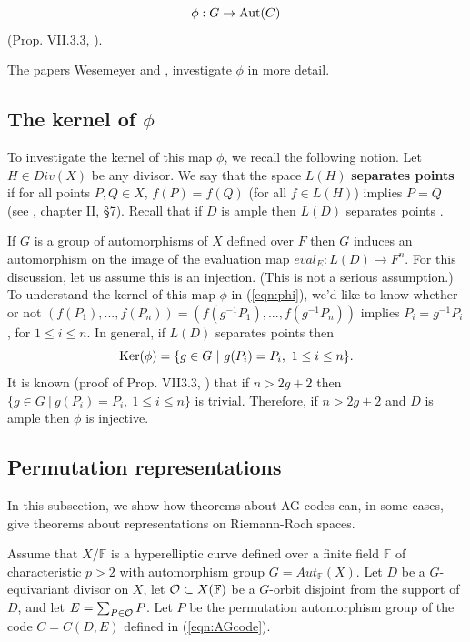 \documentclass[12pt]{article}
\numberwithin{equation}{section}
\def\fff{{\mathbb{F}}}
\begin{document}
\begin{equation}
\label{eqn:phi}
\phi:G\rightarrow {\rm Aut}(C) 
\end{equation}
(Prop. VII.3.3, \cite{Sti}).

The papers Wesemeyer \cite{W} and \cite{JT}, \cite{JK1} investigate 
$\phi$ in more detail.

\subsection{The kernel of $\phi$}

To investigate the kernel of this map $\phi$, we recall the following 
notion. Let $H\in Div(X)$ be any divisor.
We say that the space $L(H)$ {\bf separates points} if for
all points $P,Q\in X$,
$f(P)=f(Q)$ (for all $f\in L(H)$) 
implies $P=Q$ (see \cite{H}, chapter II, \S 7). 
Recall that if $D$ is ample then $L(D)$ separates points \cite{H}.

If $G$ is a group of automorphisms of $X$ defined over $F$
then $G$ induces an automorphism on the image of 
the evaluation map $eval_E : L(D)\rightarrow F^n$.
For this discussion, let us assume this is an injection.
(This is not a serious assumption.) 
To understand the kernel of this map $\phi$ in (\ref{eqn:phi}),
we'd like to know whether or not
$(f(P_1),...,f(P_n))=(f(g^{-1}P_1),...,f(g^{-1}P_n))$
implies $P_i=g^{-1}P_i$, for $1\leq i\leq n$.
In general, if $L(D)$ separates points then
\[
{\rm Ker}(\phi)=\{g\in G\ |\ g(P_i)=P_i,\ 1\leq i\leq n\}.
\]
It is known (proof of Prop. VII3.3, \cite{Sti}) that
if $n>2g+2$ then $\{g\in G\ |\ g(P_i)=P_i,\ 1\leq i\leq n\}$
is trivial. Therefore, if $n>2g+2$ and 
$D$ is ample then $\phi$ is injective.

\subsection{Permutation representations}

In this subsection, we show how theorems about AG codes
can, in some cases, give theorems about representations on
Riemann-Roch spaces.

Assume that $X/\fff$ is a hyperelliptic curve defined 
over a finite field $\fff$ 
of characteristic $p>2$ with automorphism 
group $G=Aut_\fff(X)$. 
Let $D$ be a $G$-equivariant
divisor on $X$, let ${\cal O}\subset X(\fff)$ be a 
$G$-orbit disjoint from the support of $D$, and let
$E=\sum_{P\in {\cal O}}P$. Let $P$ be the permutation automorphism
group of the code $C=C(D,E)$ defined in 
(\ref{eqn:AGcode}). 
\end{document}
